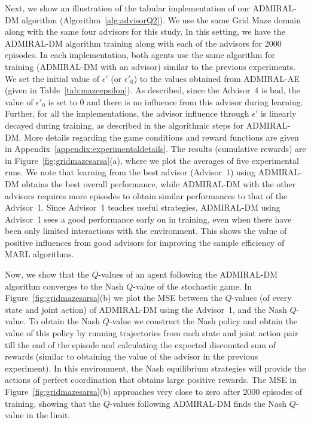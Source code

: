\documentclass[jair, twoside,11pt,theapa]{article}
\begin{document}
Next, we show an illustration of the tabular implementation of our ADMIRAL-DM algorithm (Algorithm~\ref{alg:advisorQ2}). We use the same Grid Maze domain along with the same four advisors for this study. In this setting, we have the ADMIRAL-DM algorithm training along with each of the advisors for 2000 episodes. In each implementation, both agents use the same algorithm for training (ADMIRAL-DM with an advisor) similar to the previous experiments. We set the initial value of $\epsilon'$ (or $\epsilon'_0$) to the values obtained from ADMIRAL-AE (given in Table~\ref{tab:mazeepsilon}). As described, since the Advisor~4 is bad, the value of $\epsilon'_0$ is set to 0 and there is no influence from this advisor during learning. Further, for all the implementations, the advisor influence through $\epsilon'$ is linearly decayed during training, as described in the algorithmic steps for ADMIRAL-DM. More details regarding the game conditions and reward functions are given in Appendix~\ref{appendix:experimentaldetails}. The results (cumulative rewards) are in Figure~\ref{fig:gridmazesarsa}(a), where we plot the averages of five experimental runs. We note that learning from the best advisor (Advisor~1) using ADMIRAL-DM obtains the best overall performance, while ADMIRAL-DM with the other advisors requires more episodes to obtain similar performances to that of the Advisor~1. Since Advisor~1 teaches useful strategies, ADMIRAL-DM using Advisor~1 sees a good performance early on in training, even when there have been only limited interactions with the environment. This shows the value of positive influences from good advisors for improving the sample efficiency of MARL algorithms.   

Now, we  show that the $Q$-values of an agent following the ADMIRAL-DM algorithm converges to the Nash $Q$-value of the stochastic game. In Figure~\ref{fig:gridmazesarsa}(b) we plot the MSE between the $Q$-values (of every state and joint action) of ADMIRAL-DM using the Advisor~1, and the Nash $Q$-value. To obtain the Nash $Q$-value we construct the Nash policy 
and obtain the value of this policy by running trajectories from each state and joint action pair till the end of the episode and calculating the expected discounted sum of rewards (similar to obtaining the value of the advisor in the previous experiment). In this environment, the Nash equilibrium strategies will provide the actions of perfect coordination that obtains large positive rewards. The MSE in Figure~\ref{fig:gridmazesarsa}(b) approaches very close to zero after 2000 episodes of training, showing that the $Q$-values following ADMIRAL-DM finds the Nash $Q$-value in the limit. 
\end{document}

